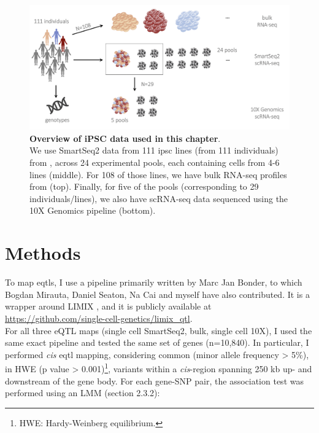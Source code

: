 \begin{figure}[h]
\centering
\includegraphics[width=14cm]{Chapter3/Fig/ips_data.png}
\caption[iPSC data]{\textbf{Overview of iPSC data used in this chapter}.\\
We use SmartSeq2 \cite{purcell2007plink} data from 111 \gls{ipsc} lines (from 111 individuals) from \cite{cuomo2020single}, across 24 experimental pools, each containing cells from 4-6 lines (middle).
For 108 of those lines, we have bulk RNA-seq profiles from \cite{mirauta2018population} (top).
Finally, for five of the pools (corresponding to 29 individuals/lines), we also have scRNA-seq data sequenced using the 10X Genomics pipeline \cite{zheng2017massively} (bottom).}
\label{fig:ipsc_data}
\end{figure}

\section{Methods}

To map \glspl{eqtl}, I use a pipeline primarily written by Marc Jan Bonder, to which Bogdan Mirauta, Daniel Seaton, Na Cai and myself have also contributed. 
It is a wrapper around LIMIX \cite{lippert2014limix, casale2015efficient}, and it is publicly available at \url{https://github.com/single-cell-genetics/limix_qtl}. \\

For all three eQTL maps (single cell SmartSeq2, bulk, single cell 10X), I used the same exact pipeline and tested the same set of genes (n=10,840).
In particular, I performed \textit{cis} \gls{eqtl} mapping, considering common (minor allele frequency > 5\%), in HWE (p value > 0.001)\footnote{HWE: Hardy-Weinberg equilibrium.}, variants within a \textit{cis}-region spanning 250 kb up- and downstream of the gene body.
For each gene-SNP pair, the association test was performed using an LMM (section
2.3.2):


